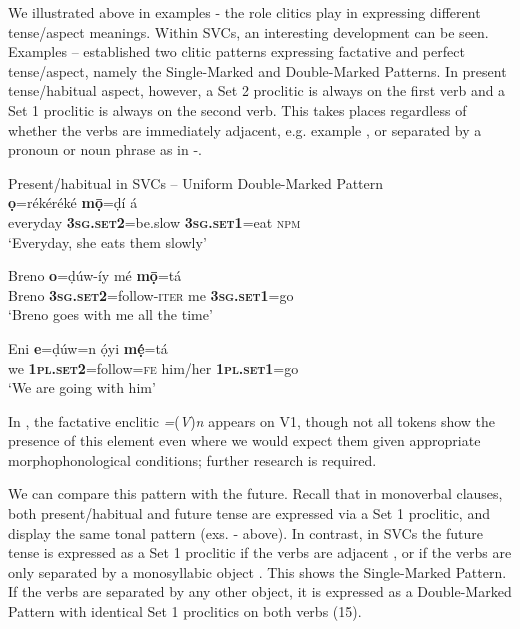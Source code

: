 \documentclass[output=paper]{langsci/langscibook}
\begin{document}
We illustrated above in examples - the role clitics play in expressing different tense/aspect meanings. Within SVCs, an interesting development can be seen. Examples -- established two clitic patterns expressing factative and perfect tense/aspect, namely the Single-Marked and Double-Marked Patterns. In present tense/habitual aspect, however, a Set 2 proclitic is always on the first verb and a Set 1 proclitic is always on the second verb. This takes places regardless of whether the verbs are immediately adjacent, e.g. example , or separated by a pronoun or noun phrase as in -. 

\ea
{Present/habitual in SVCs – Uniform Double-Marked Pattern}\\
   \ea\label{ex:rolle:14}
  \textbf{ọ}=rékéréké       \textbf{mọ̄}=ḍí       á\\ 
       everyday     \textbf{\textsc{3sg.set2}}=be.slow  \textbf{\textsc{3sg.set1}}=eat  \textsc{npm}\\
\glt ‘Everyday, she eats them slowly’ 

\ex\label{ex:rolle:15}
\gll   Breno   \textbf{o}=ḍúw-íy         mé   \textbf{mọ̄}=tá\\ 
       Breno   \textbf{\textsc{3sg.set2}}=follow-\textsc{iter}  me   \textbf{3}\textbf{\textsc{sg.set1}}\textsc{=}go\\
\glt ‘Breno goes with me all the time’

\ex\label{ex:rolle:16}
\gll   Eni   \textbf{e}=ḍúw=n       ọ́yi       \textbf{mẹ́}=tá\\ 
       we   \textbf{\textsc{1pl.set2}}=follow=\textsc{fe}   him/her    \textbf{\textsc{1pl.set1}}=go\\
\glt ‘We are going with him’
\z
\z 

In , the factative enclitic \textit{=}(\textit{V})\textit{n} appears on V1, though not all tokens show the presence of this element even where we would expect them given appropriate morphophonological conditions; further research is required. 

We can compare this pattern with the future. Recall that in monoverbal clauses, both present/habitual and future tense are expressed via a Set 1 proclitic, and display the same tonal pattern (exs. - above). In contrast, in SVCs the future tense is expressed as a Set 1 proclitic if the verbs are adjacent , or if the verbs are only separated by a monosyllabic object . This shows the Single-Marked Pattern. If the verbs are separated by any other object, it is expressed as a Double-Marked Pattern with identical Set 1 proclitics on both verbs (15).  
\end{document}
